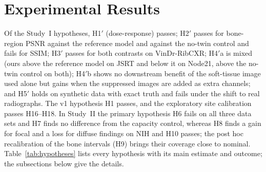 \section{Experimental Results}
\label{sec:results}
Of the Study~I hypotheses, H1$'$ (dose-response) passes; H2$'$ passes for bone-region PSNR against the reference model and against the
no-twin control and fails for SSIM; H3$'$ passes for both contrasts on VinDr-RibCXR; H4$'$a is mixed (ours above the reference model on
JSRT and below it on Node21, above the no-twin control on both); H4$'$b shows no downstream benefit of the soft-tissue image used alone but
gains when the suppressed images are added as extra channels; and H5$'$ holds on synthetic data with exact truth and fails under the shift
to real radiographs. The v1 hypothesis H1 passes, and the exploratory site calibration passes H16--H18. In Study~II the primary hypothesis
H6 fails on all three data sets and H7 finds no difference from the capacity control, whereas H8 finds a gain for focal and a loss for
diffuse findings on NIH and H10 passes; the post hoc recalibration of the bone intervals (H9) brings their coverage close to nominal.
Table~\ref{tab:hypotheses} lists every hypothesis with its main estimate and outcome; the subsections below give the details.

